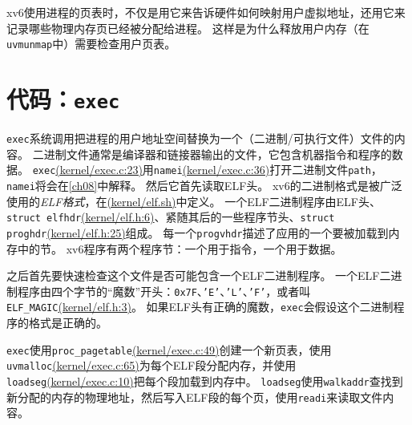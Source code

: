 xv6使用进程的页表时，不仅是用它来告诉硬件如何映射用户虚拟地址，还用它来记录哪些物理内存页已经被分配给进程。
这样是为什么释放用户内存（在\texttt{uvmunmap}中）需要检查用户页表。

\section{代码：\texttt{exec}}
\texttt{exec}系统调用把进程的用户地址空间替换为一个（二进制/可执行文件）文件的内容。
二进制文件通常是编译器和链接器输出的文件，它包含机器指令和程序的数据。
\texttt{exec}\href{https://github.com/mit-pdos/xv6-riscv/blob/riscv//kernel/exec.c#L23}{(kernel/exec.c:23)}用\texttt{namei}\href{https://github.com/mit-pdos/xv6-riscv/blob/riscv//kernel/exec.c#L36}{(kernel/exec.c:36)}打开二进制文件\texttt{path}，\texttt{namei}将会在\autoref{ch08}中解释。
然后它首先读取ELF头。
xv6的二进制格式是被广泛使用的\emph{ELF格式}，在\href{https://github.com/mit-pdos/xv6-riscv/blob/riscv//kernel/elf.h}{(kernel/elf.sh)}中定义。
一个ELF二进制程序由ELF头、\texttt{struct elfhdr}\href{https://github.com/mit-pdos/xv6-riscv/blob/riscv//kernel/elf.h#L6}{(kernel/elf.h:6)}、紧随其后的一些程序节头、\texttt{struct proghdr}\href{https://github.com/mit-pdos/xv6-riscv/blob/riscv//kernel/elf.h#L25}{(kernel/elf.h:25)}组成。
每一个\texttt{progvhdr}描述了应用的一个要被加载到内存中的节。
xv6程序有两个程序节：一个用于指令，一个用于数据。

之后首先要快速检查这个文件是否可能包含一个ELF二进制程序。
一个ELF二进制程序由四个字节的“魔数”开头：\texttt{0x7F}、\texttt{'E'}、\texttt{'L'}、\texttt{'F'}，或者叫\texttt{ELF\_MAGIC}\href{https://github.com/mit-pdos/xv6-riscv/blob/riscv//kernel/elf.h#L3}{(kernel/elf.h:3)}。
如果ELF头有正确的魔数，\texttt{exec}会假设这个二进制程序的格式是正确的。

\texttt{exec}使用\texttt{proc\_pagetable}\href{https://github.com/mit-pdos/xv6-riscv/blob/riscv//kernel/exec.c#L49}{(kernel/exec.c:49)}创建一个新页表，使用\texttt{uvmalloc}\href{https://github.com/mit-pdos/xv6-riscv/blob/riscv//kernel/exec.c#L65}{(kernel/exec.c:65)}为每个ELF段分配内存，并使用\texttt{loadseg}\href{https://github.com/mit-pdos/xv6-riscv/blob/riscv//kernel/exec.c#L10}{(kernel/exec.c:10)}把每个段加载到内存中。
\texttt{loadseg}使用\texttt{walkaddr}查找到新分配的内存的物理地址，然后写入ELF段的每个页，使用\texttt{readi}来读取文件内容。

